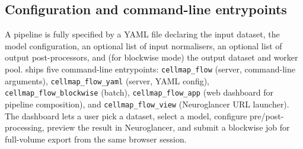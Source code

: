 \subsection*{Configuration and command-line entrypoints}

A pipeline is fully specified by a YAML file declaring the input dataset, the model configuration, an optional list of input normalisers, an optional list of output post-processors, and (for blockwise mode) the output dataset and worker pool. \cellmapflow{} ships five command-line entrypoints: \texttt{cellmap\_flow} (server, command-line arguments), \texttt{cellmap\_flow\_yaml} (server, YAML config), \texttt{cellmap\_flow\_blockwise} (batch), \texttt{cellmap\_flow\_app} (web dashboard for pipeline composition), and \texttt{cellmap\_flow\_view} (Neuroglancer URL launcher). The dashboard lets a user pick a dataset, select a model, configure pre/post-processing, preview the result in Neuroglancer, and submit a blockwise job for full-volume export from the same browser session.
